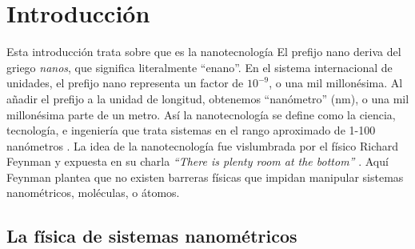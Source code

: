 \chapter*{Introducción}
Esta introducción trata sobre que es la nanotecnología
El prefijo nano deriva del griego \emph{nanos}, que significa literalmente ``enano''. En el sistema internacional de unidades, el prefijo nano representa un factor de $\mathrm{10^{-9}}$, o una mil millonésima. Al añadir el prefijo a la unidad de longitud, obtenemos ``nanómetro'' (nm), o una mil millonésima parte de un metro. Así la nanotecnología se define como la ciencia, tecnología, e ingeniería que trata sistemas en el rango aproximado de 1-100 nanómetros \citep{Haick2013}.
La idea de la nanotecnología fue vislumbrada por el físico Richard Feynman y expuesta en su charla \emph{``There is plenty room at the bottom''} \citep{Feynman1960}. Aquí Feynman plantea que no existen barreras físicas que impidan manipular sistemas nanométricos, moléculas, o átomos.

\section*{La física de sistemas nanométricos}

